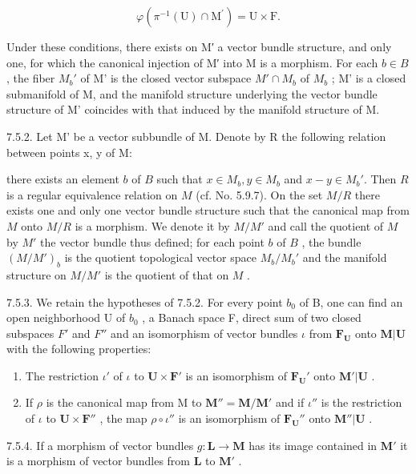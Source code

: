 \[
\varphi (\pi^ {- 1} (\mathrm{U}) \cap \mathrm{M} ^ {\prime}) = \mathrm{U} \times \mathrm{F}.
\]

Under these conditions, there exists on M′ a vector bundle structure, and only one, for which the canonical injection of M′ into M is a morphism. For each \(b \in B\) , the fiber \(M_{b}'\) of M' is the closed vector subspace \(M' \cap M_{b}\) of \(M_{b}\) ; M' is a closed submanifold of M, and the manifold structure underlying the vector bundle structure of M' coincides with that induced by the manifold structure of M.

7.5.2. Let M' be a vector subbundle of M. Denote by R the following relation between points x, y of M:

there exists an element \(b\) of \(B\) such that \(x \in M_b, y \in M_b\) and \(x - y \in M_b'\). Then \(R\) is a regular equivalence relation on \(M\) (cf. No. 5.9.7). On the set \(M/R\) there exists one and only one vector bundle structure such that the canonical map from \(M\) onto \(M/R\) is a morphism. We denote it by \(M/M'\) and call the quotient of \(M\) by \(M'\) the vector bundle thus defined; for each point \(b\) of \(B\) , the bundle \((M/M')_b\) is the quotient topological vector space \(M_b/M_b'\) and the manifold structure on \(M/M'\) is the quotient of that on \(M\) .

7.5.3. We retain the hypotheses of 7.5.2. For every point \(b_0\) of B, one can find an open neighborhood U of \(b_0\) , a Banach space F, direct sum of two closed subspaces \(F'\) and \(F''\) and an isomorphism of vector bundles \(\iota\) from \(\mathbf{F}_{\mathbf{U}}\) onto \(\mathbf{M}|\mathbf{U}\) with the following properties:

\begin{enumerate}
\def\labelenumi{(\roman{enumi})}
\item
  The restriction \(\iota'\) of \(\iota\) to \(\mathbf{U} \times \mathbf{F}'\) is an isomorphism of \(\mathbf{F}_{\mathbf{U}}'\) onto \(\mathbf{M}'|\mathbf{U}\) .
\item
  If \(\rho\) is the canonical map from M to \(\mathbf{M}'' = \mathbf{M} / \mathbf{M}'\) and if \(\iota''\) is the restriction of \(\iota\) to \(\mathbf{U} \times \mathbf{F}''\) , the map \(\rho \circ \iota''\) is an isomorphism of \(\mathbf{F}_{\mathbf{U}}''\) onto \(\mathbf{M}''|\mathbf{U}\) .
\end{enumerate}

7.5.4. If a morphism of vector bundles \(g: \mathbf{L} \to \mathbf{M}\) has its image contained in \(\mathbf{M}'\) it is a morphism of vector bundles from \(\mathbf{L}\) to \(\mathbf{M}'\) .

